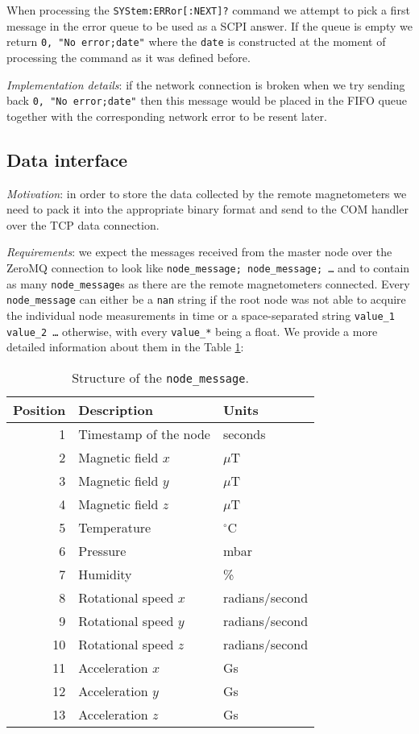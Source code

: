 When processing the  \texttt{SYStem:ERRor[:NEXT]?} command we attempt to pick a first message in the error queue to be used as a SCPI answer. If the queue is empty we return \texttt{0, "No error;date"} where the \texttt{date} is constructed at the moment of processing the command as it was defined before.

\textit{Implementation details}: if the network connection is broken when we try sending back \texttt{0, "No error;date"} then this message would be placed in the FIFO queue together with the corresponding network error to be resent later.

\subsection{Data interface}
\label{subsec:rm-proxy_data}

\textit{Motivation}: in order to store the data collected by the remote magnetometers we need to pack it into the appropriate \cite{Bison2018} binary format and send to the COM handler over the TCP data connection.

\textit{Requirements}: we expect the messages received from the master node over the ZeroMQ connection to look like \texttt{node\_message; node\_message; \ldots} and to contain as many \texttt{node\_message}s as there are the remote magnetometers connected. Every \texttt{node\_message} can either be a \texttt{nan} string if the root node was not able to acquire the individual node measurements in time or a space-separated string \texttt{value\_1 value\_2 \ldots} otherwise, with every \texttt{value\_*} being a float. We provide a more detailed information about them in the Table \ref{tbl:node_message}:

\begin{table}[h]
\centering
\begin{tabular}{|r|l|l|}
	\hline
	Position & Description & Units \\
	\hline \hline
	1 & Timestamp of the node & seconds \\
	\hline
	2 & Magnetic field $x$ & $\mu$T \\
	\hline
	3 & Magnetic field $y$ & $\mu$T \\
	\hline
	4 & Magnetic field $z$ & $\mu$T \\
	\hline
	5 & Temperature & $^\circ$C \\
	\hline
	6 & Pressure & mbar \\
	\hline
	7 & Humidity & \% \\
	\hline
	8 & Rotational speed $x$ & radians/second \\
	\hline
	9 & Rotational speed $y$ & radians/second \\
	\hline
	10 & Rotational speed $z$ & radians/second \\
	\hline
	11 & Acceleration $x$ & Gs \\
	\hline
	12 & Acceleration $y$ & Gs \\
	\hline
	13 & Acceleration $z$ & Gs \\
	\hline
\end{tabular}
\caption{Structure of the \texttt{node\_message}.}
\label{tbl:node_message}
\end{table}

